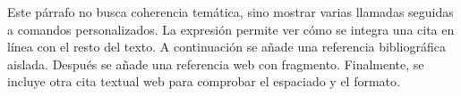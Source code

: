 Este párrafo no busca coherencia temática, sino mostrar varias llamadas seguidas a comandos personalizados. La expresión  permite ver cómo se integra una cita en línea con el resto del texto. A continuación se añade una referencia bibliográfica aislada. Después se añade una referencia web con fragmento. Finalmente, se incluye otra cita textual web para comprobar el espaciado y el formato.
